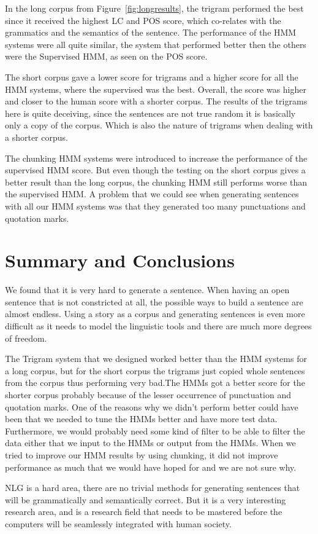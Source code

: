 \documentclass[a4paper,12pt]{article}
\begin{document}
In the long corpus from Figure~\ref{fig:longresults}, the trigram performed 
the best since it received the highest LC and POS score, which co-relates with the
grammatics and the semantics of the sentence. The performance of the 
HMM systems were all quite similar, the system that performed better then the 
others were the Supervised HMM, as seen on the POS score.

The short corpus gave a lower score for trigrams and a higher score for all the 
HMM systems, where the supervised was the best. Overall, the score was 
higher and closer to the human score with a shorter corpus.
The results of the trigrams here is quite deceiving, since the sentences are 
not true random it is basically only a copy of the corpus. Which is also the 
nature of trigrams when dealing with a shorter corpus.

The chunking HMM systems were introduced to increase the performance of the
supervised HMM score. But even though the testing on the short corpus gives a
better result than the long corpus, the chunking HMM still performs worse than
the supervised HMM.
A problem that we could see when generating sentences with all our HMM systems
was that they generated too many punctuations and quotation marks.

\section{Summary and Conclusions}
We found that it is very hard to generate a sentence. When having an open
sentence that is not constricted at all, the possible ways to build a sentence
are almost endless. Using a story as a corpus and generating sentences is even
more difficult as it needs to model the linguistic tools and there are much more
degrees of freedom.

The Trigram system that we designed worked better than the HMM systems for a
long corpus, but for the short corpus the trigrams just copied whole sentences
from the corpus thus performing very bad.The HMMs got a better score for the shorter corpus probably because of the
lesser occurrence of punctuation and quotation marks.
One of the reasons why we didn't perform better could have been that we needed
to tune the HMMs better and have more test data. Furthermore, we would probably
need some kind of filter to be able to filter the data either that we input to
the HMMs or output from the HMMs. When we tried to improve our HMM 
results by using chunking, it did not improve performance as much that we 
would have hoped for and we are not sure why.

NLG is a hard area, there are no trivial methods for generating sentences that
will be grammatically and semantically correct.
But it is a very interesting research area, and is a research field that needs
to be mastered before the computers will be seamlessly integrated with human society.
\label{sec:summary}


\end{document}
